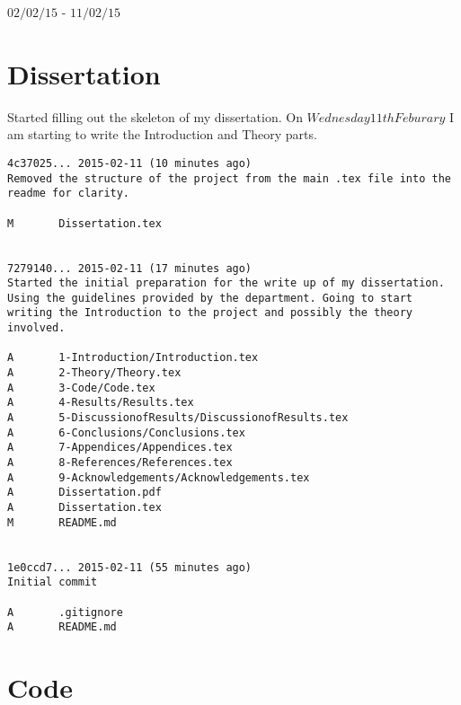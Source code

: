 \documentclass[12pt,a4paper,notitlepage,twoside]{memoir}
\author{Robert James}
\begin{document}
\begin{Large}
\begin{center}
$02/02/15$ - $11/02/15$
\end{center}
\end{Large}

\section{Dissertation}

Started filling out the skeleton of my dissertation. On $Wednesday 11th Feburary$ I am starting to write the Introduction and Theory parts.

\begin{lstlisting}[breaklines]
4c37025... 2015-02-11 (10 minutes ago)
Removed the structure of the project from the main .tex file into the readme for clarity.

M       Dissertation.tex


7279140... 2015-02-11 (17 minutes ago)
Started the initial preparation for the write up of my dissertation. Using the guidelines provided by the department. Going to start writing the Introduction to the project and possibly the theory involved.

A       1-Introduction/Introduction.tex
A       2-Theory/Theory.tex
A       3-Code/Code.tex
A       4-Results/Results.tex
A       5-DiscussionofResults/DiscussionofResults.tex
A       6-Conclusions/Conclusions.tex
A       7-Appendices/Appendices.tex
A       8-References/References.tex
A       9-Acknowledgements/Acknowledgements.tex
A       Dissertation.pdf
A       Dissertation.tex
M       README.md


1e0ccd7... 2015-02-11 (55 minutes ago)
Initial commit

A       .gitignore
A       README.md

\end{lstlisting}


\section{Code}
\end{document}
